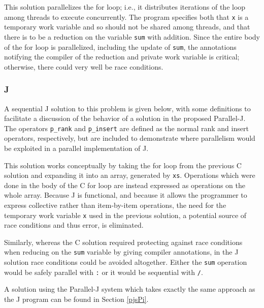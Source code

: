 This solution parallelizes the for loop; 
i.e., it distributes iterations of the loop among threads to execute concurrently.
The program specifies both that \texttt{x} is a temporary work variable and so should not be shared among threads, 
and that there is to be a reduction on the variable \texttt{sum} with addition. 
Since the entire body of the for loop is parallelized, including the update of \texttt{sum}, 
the annotations notifying the compiler of the reduction and private work variable is critical; 
otherwise, there could very well be race conditions.

\subsubsection{J}
A sequential J solution to this problem is given below, 
with some definitions to facilitate a discussion 
of the behavior of a solution in the proposed Parallel-J. 
The operators \texttt{p\_rank} and \texttt{p\_insert}
are defined as the normal rank and insert operators, respectively,  
but are included to demonstrate where parallelism would be exploited in a parallel implementation of J.

\begin{singlespacing}
\begin{small}

\end{small}
\end{singlespacing}

This solution works conceptually by taking the for loop from the previous C solution 
and expanding it into an array, generated by \texttt{xs}.
Operations which were done in the body of the C for loop 
are instead expressed as operations on the whole array. 
Because J is functional, and 
because it allows the programmer to express collective rather than item-by-item operations, 
the need for the temporary work variable \texttt{x} used in the previous solution, 
a potential source of race conditions and thus error, is eliminated. 

Similarly, whereas the C solution required 
protecting against race conditions when reducing on the \texttt{sum} variable
by giving compiler annotations, 
in the J solution race conditions could be avoided altogether.
Either the \texttt{sum} operation would be safely parallel with \texttt{\::} or 
it would be sequential with \texttt{/}.

A solution using the Parallel-J system which takes exactly the same approach as the J program 
can be found in Section \ref{pjsPi}.

